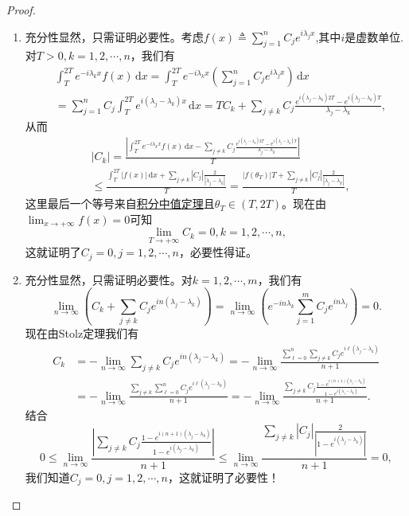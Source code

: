 \documentclass[../../main.tex]{subfiles}%
\begin{document}
\begin{proof}
\begin{enumerate}
\item 充分性显然，只需证明必要性。考虑$f(x)\triangleq\sum_{j=1}^n C_j e^{i\lambda_j x}$,其中$i$是虚数单位.对$T>0,k=1,2,\cdots,n$，我们有
\begin{align*}
&\int_T^{2T} e^{-i\lambda_k x}f(x)\,\mathrm{d}x=\int_T^{2T} e^{-i\lambda_k x}\left(\sum_{j=1}^n C_j e^{i\lambda_j x}\right)\,\mathrm{d}x\\
&=\sum_{j=1}^n C_j\int_T^{2T} e^{i(\lambda_j-\lambda_k)x}\,\mathrm{d}x=TC_k+\sum_{j\neq k} C_j\frac{e^{i(\lambda_j-\lambda_k)2T}-e^{i(\lambda_j-\lambda_k)T}}{\lambda_j-\lambda_k},
\end{align*}
从而
\begin{align*}
&|C_k|=\frac{\left|\int_T^{2T} e^{-i\lambda_k x}f(x)\,\mathrm{d}x-\sum\limits_{j\neq k} C_j\frac{e^{i(\lambda_j-\lambda_k)2T}-e^{i(\lambda_j-\lambda_k)T}}{\lambda_j-\lambda_k}\right|}{T}
\\
&\leqslant \frac{\int_T^{2T}|f(x)|\,\mathrm{d}x+\sum\limits_{j\neq k} |C_j|\frac{2}{|\lambda_j-\lambda_k|}}{T}=\frac{|f(\theta_T)|T+\sum\limits_{j\neq k} |C_j|\frac{2}{|\lambda_j-\lambda_k|}}{T},
\end{align*}
这里最后一个等号来自\hyperref[theorem:积分中值定理]{积分中值定理}且$\theta_T\in(T,2T)$。现在由$\lim_{x\to+\infty}f(x)=0$可知
\[
\lim_{T\to+\infty} C_k=0,k=1,2,\cdots,n,
\]
这就证明了$C_j=0,j=1,2,\cdots,n$，必要性得证。

\item 充分性显然，只需证明必要性。对$k=1,2,\cdots,m$，我们有
\[
\lim_{n\to\infty}\left(C_k+\sum_{j\neq k} C_j e^{in(\lambda_j-\lambda_k)}\right)=\lim_{n\to\infty}\left(e^{-in\lambda_k}\sum_{j=1}^m C_j e^{in\lambda_j}\right)=0.
\]
现在由Stolz定理我们有
\begin{align*}
C_k&=-\lim_{n\rightarrow \infty} \sum_{j\ne k}{C_je^{in(\lambda _j-\lambda _k)}}=-\lim_{n\rightarrow \infty} \frac{\sum\limits_{\ell =0}^n{\sum\limits_{j\ne k}{C_je^{i\ell (\lambda _j-\lambda _k)}}}}{n+1}
\\
&=-\lim_{n\rightarrow \infty} \frac{\sum\limits_{j\ne k}{\sum\limits_{\ell =0}^n{C_je^{i\ell (\lambda _j-\lambda _k)}}}}{n+1}=-\lim_{n\rightarrow \infty} \frac{\sum\limits_{j\ne k}{C_j\frac{1-e^{i(n+1)(\lambda _j-\lambda _k)}}{1-e^{i(\lambda _j-\lambda _k)}}}}{n+1}.
\end{align*}
结合
\[
0\leqslant \lim_{n\to\infty}\frac{\left|\sum\limits_{j\neq k} C_j\frac{1-e^{i(n+1)(\lambda_j-\lambda_k)}}{1-e^{i(\lambda_j-\lambda_k)}}\right|}{n+1}\leqslant \lim_{n\to\infty}\frac{\sum\limits_{j\neq k}|C_j|\frac{2}{|1-e^{i(\lambda_j-\lambda_k)}|}}{n+1}=0,
\]
我们知道$C_j=0,j=1,2,\cdots,n$，这就证明了必要性！
\end{enumerate}

\end{proof}
\end{document}
